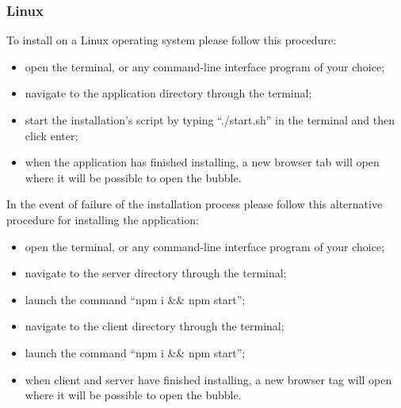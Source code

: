 \subsubsection{Linux}
To install \DemoName{} on a Linux operating system please follow this procedure:
\begin{itemize}
	\item open the terminal, or any command-line interface program of your choice;
	\item navigate to the application directory through the terminal; 
	\item start the installation's script by typing ``./start.sh'' in the terminal and then click enter;
	\item when the application has finished installing, a new browser tab will open where it will be possible to open the bubble.
\end{itemize}

In the event of failure of the installation process please follow this alternative procedure for installing the application:
\begin{itemize}
	\item open the terminal, or any command-line interface program of your choice;
	\item navigate to the server directory through the terminal;
	\item launch the command ``npm i \&\& npm start'';
	\item navigate to the client directory through the terminal;
	\item launch the command ``npm i \&\& npm start'';
	\item when client and server have finished installing, a new browser tag will open where it will be possible to open the bubble.
\end{itemize}
